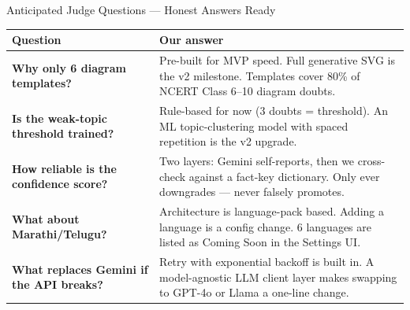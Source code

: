 \documentclass[aspectratio=169, 12pt]{beamer}
\begin{document}
\begin{frame}{Anticipated Judge Questions --- Honest Answers Ready}
  \renewcommand{\arraystretch}{1.6}
  \begin{tabular}{>{\small\bfseries}p{} >{\small}p{}}
    \toprule
    \rowcolor{deepgreen!15}
    Question & Our answer\\
    \midrule
    Why only 6 diagram templates? & Pre-built for MVP speed. Full generative SVG is the v2 milestone. Templates cover 80\% of NCERT Class 6--10 diagram doubts.\\
    \rowcolor{lightgreen!10}
    Is the weak-topic threshold trained? & Rule-based for now (3 doubts = threshold). An ML topic-clustering model with spaced repetition is the v2 upgrade.\\
    How reliable is the confidence score? & Two layers: Gemini self-reports, then we cross-check against a fact-key dictionary. Only ever downgrades --- never falsely promotes.\\
    \rowcolor{lightgreen!10}
    What about Marathi/Telugu? & Architecture is language-pack based. Adding a language is a config change. 6 languages are listed as Coming Soon in the Settings UI.\\
    What replaces Gemini if the API breaks? & Retry with exponential backoff is built in. A model-agnostic LLM client layer makes swapping to GPT-4o or Llama a one-line change.\\
    \bottomrule
  \end{tabular}
\end{frame}
\end{document}
